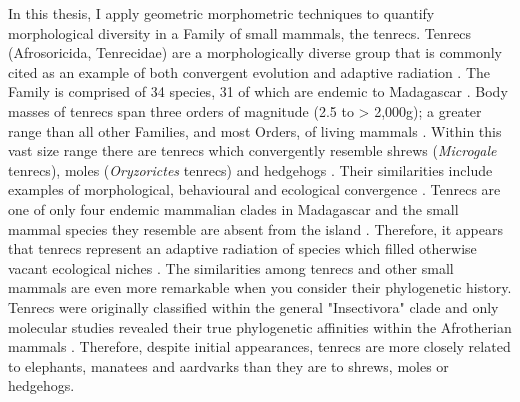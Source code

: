 	In this thesis, I apply geometric morphometric techniques to quantify morphological diversity in a Family of small mammals, the tenrecs. Tenrecs (Afrosoricida, Tenrecidae) are a morphologically diverse group that is commonly cited as an example of both convergent evolution and adaptive radiation \citep{Soarimalala2011, Eisenberg1969}. The Family is comprised of 34 species, 31 of which are endemic to Madagascar \citep{Olson2013}. Body masses of tenrecs span three orders of magnitude (2.5 to > 2,000g); a greater range than all other Families, and most Orders, of living mammals \citep{Olson2003}. Within this vast size range there are tenrecs which convergently resemble shrews (\textit{Microgale} tenrecs), moles (\textit{Oryzorictes} tenrecs) and hedgehogs \citep[\textit{Echinops} and \textit{Setifer} tenrecs,][Figure \ref{fig:tenrecs}]{Eisenberg1969}. Their similarities include examples of morphological, behavioural and ecological convergence \citep{Soarimalala2011}. Tenrecs are one of only four endemic mammalian clades in Madagascar and the small mammal species they resemble are absent from the island \citep{Garbutt1999}. Therefore, it appears that tenrecs represent an adaptive radiation of species which filled otherwise vacant ecological niches \citep{Soarimalala2011}.
	The similarities among tenrecs and other small mammals are even more remarkable when you consider their phylogenetic history. Tenrecs were originally classified within the general "Insectivora" clade and only molecular studies revealed their true phylogenetic affinities within the Afrotherian mammals \citep{Stanhope1998}. Therefore, despite initial appearances, tenrecs are more closely related to elephants, manatees and aardvarks than they are to shrews, moles or hedgehogs. 
